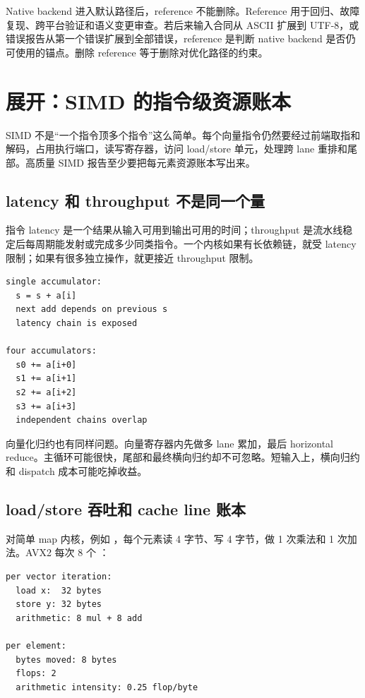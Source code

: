 Native backend 进入默认路径后，reference 不能删除。Reference 用于回归、故障复现、跨平台验证和语义变更审查。若后来输入合同从 ASCII 扩展到 UTF-8，或错误报告从第一个错误扩展到全部错误，reference 是判断 native backend 是否仍可使用的锚点。删除 reference 等于删除对优化路径的约束。

\section{展开：SIMD 的指令级资源账本}

SIMD 不是“一个指令顶多个指令”这么简单。每个向量指令仍然要经过前端取指和解码，占用执行端口，读写寄存器，访问 load/store 单元，处理跨 lane 重排和尾部。高质量 SIMD 报告至少要把每元素资源账本写出来。

\subsection{latency 和 throughput 不是同一个量}

指令 latency 是一个结果从输入可用到输出可用的时间；throughput 是流水线稳定后每周期能发射或完成多少同类指令。一个内核如果有长依赖链，就受 latency 限制；如果有很多独立操作，就更接近 throughput 限制。

\begin{lstlisting}[numbers=none,caption={单累加和多累加的差异}]
single accumulator:
  s = s + a[i]
  next add depends on previous s
  latency chain is exposed

four accumulators:
  s0 += a[i+0]
  s1 += a[i+1]
  s2 += a[i+2]
  s3 += a[i+3]
  independent chains overlap
\end{lstlisting}

向量化归约也有同样问题。向量寄存器内先做多 lane 累加，最后 horizontal reduce。主循环可能很快，尾部和最终横向归约却不可忽略。短输入上，横向归约和 dispatch 成本可能吃掉收益。

\subsection{load/store 吞吐和 cache line 账本}

对简单 map 内核，例如 ，每个元素读 4 字节、写 4 字节，做 1 次乘法和 1 次加法。AVX2 每次 8 个 ：

\begin{lstlisting}[numbers=none,caption={AVX2 float map 的单迭代账本}]
per vector iteration:
  load x:  32 bytes
  store y: 32 bytes
  arithmetic: 8 mul + 8 add

per element:
  bytes moved: 8 bytes
  flops: 2
  arithmetic intensity: 0.25 flop/byte
\end{lstlisting}

